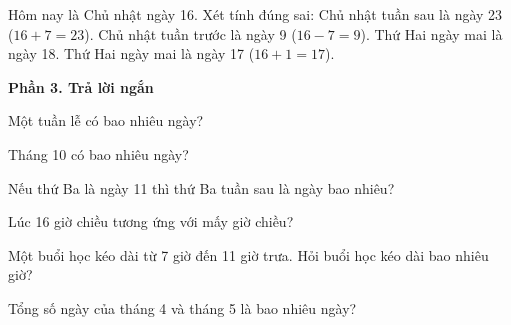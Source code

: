 \begin{ex} %
Hôm nay là Chủ nhật ngày 16. Xét tính đúng sai:
\choiceTF
{\True Chủ nhật tuần sau là ngày 23 ($16 + 7 = 23$).}
{\True Chủ nhật tuần trước là ngày 9 ($16 - 7 = 9$).}
{Thứ Hai ngày mai là ngày 18.}
{\True Thứ Hai ngày mai là ngày 17 ($16 + 1 = 17$).}
\end{ex}

\textbf{Phần 3. Trả lời ngắn}

\begin{ex} %
Một tuần lễ có bao nhiêu ngày?
\end{ex}

\begin{ex} %
Tháng 10 có bao nhiêu ngày?
\end{ex}

\begin{ex} %
Nếu thứ Ba là ngày 11 thì thứ Ba tuần sau là ngày bao nhiêu?
\end{ex}

\begin{ex} %
Lúc 16 giờ chiều tương ứng với mấy giờ chiều?
\end{ex}

\begin{ex} %
Một buổi học kéo dài từ 7 giờ đến 11 giờ trưa. Hỏi buổi học kéo dài bao nhiêu giờ?
\end{ex}

\begin{ex} %
Tổng số ngày của tháng 4 và tháng 5 là bao nhiêu ngày?
\end{ex}
